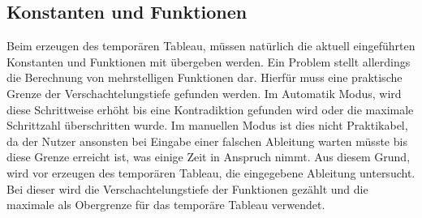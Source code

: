 \subsection{Konstanten und Funktionen}
Beim erzeugen des temporären Tableau, müssen natürlich die aktuell eingeführten Konstanten und Funktionen mit übergeben werden. Ein Problem stellt allerdings die Berechnung von mehrstelligen Funktionen dar. Hierfür muss eine praktische Grenze der Verschachtelungstiefe gefunden werden. Im Automatik Modus, wird diese Schrittweise erhöht bis eine Kontradiktion gefunden wird oder die maximale Schrittzahl überschritten wurde. Im manuellen Modus ist dies nicht Praktikabel, da der Nutzer ansonsten bei Eingabe einer falschen Ableitung warten müsste bis diese Grenze erreicht ist, was einige Zeit in Anspruch nimmt. Aus diesem Grund, wird vor erzeugen des temporären Tableau, die eingegebene Ableitung untersucht. Bei dieser wird die Verschachtelungstiefe der Funktionen gezählt und die maximale als Obergrenze für das temporäre Tableau verwendet.





